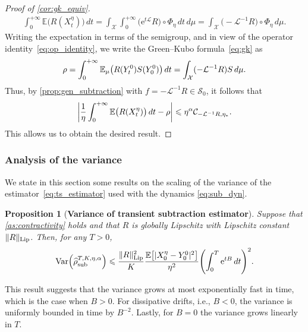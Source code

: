 \documentclass[11pt]{article}
\newcommand{\E}{\mathbb{E}}
\newcommand{\e}{\mathrm{e}}
\renewcommand{\L}{\mathcal{L}}
\renewcommand{\S}{\mathscr{S}}
\renewcommand{\leq}{\leqslant}
\DeclareMathOperator{\Var}{Var}
\DeclarePairedDelimiter\abs{\lvert}{\rvert}
\DeclarePairedDelimiter\paren{\lparen}{\rparen}
\DeclarePairedDelimiter\bkt{\lbrack}{\rbrack}
\newtheorem{proposition}{Proposition}
\theoremstyle{definition}
\newcommand{\RLip}{\|R\|_{\rm Lip}}
\newcommand{\estTmp}{\widehat{\rho}}
\newcommand{\aTSest}{\estTmp^{T,K,\eta,\alpha}_{\rm sub}} %
\begin{document}
\begin{proof}[Proof of \cref{cor:gk_equiv}]
\begin{align}
		\int_0^{+\infty} \E\bigl(R(X^\eta_t)\bigr) \, dt = \int_\mathcal{X}\int_0^{+\infty} \bigl(\e^{t\L}R\bigr)\circ \Phi_\eta \, dt \, d\mu
= \int_\mathcal{X} \bigl(-\L^{-1}R\bigr)\circ \Phi_\eta \, d\mu.
		\label{eq:cor_Tint_to_LinvR}
\end{align}
Writing the expectation in terms of the semigroup, and in view of the operator identity~\eqref{eq:op_identity}, we write the Green--Kubo formula~\eqref{eq:gk} as
\begin{align}
    \notag
		\rho = \int_0^{+\infty} \E_\mu\bigl(R(Y_t^0)S(Y_0^0)\bigr) \, dt = \int_\mathcal{X} (-\L^{-1}R)S \, d\mu.
	\end{align}
Thus, by \cref{prop:gen_subtraction} with $f = -\L^{-1}R \in \S_0$, it follows that
\begin{equation}
		\abs*{\frac{1}{\eta}\int_0^{+\infty} \E\bigl(R(X^\eta_t)\bigr) \, dt - \rho} \leq \eta^{\alpha} \mathcal{C}_{-\L^{-1}R,\eta_*}.
		\label{eq:cor_eta_bias}
	\end{equation}
This allows us to obtain the desired result.
\end{proof}

\subsubsection{Analysis of the variance}
\label{subsubsec:variance_analysis}
We state in this section some results on the scaling of the variance of the estimator~\eqref{eq:ts_estimator} used with the dynamics \eqref{eq:sub_dyn}.

\begin{proposition}[{\bf Variance of transient subtraction estimator}]
	\label{prop:var_ts}
	Suppose that \cref{as:contractivity} holds and that $R$ is globally Lipschitz with Lipschitz constant $\RLip$. Then, for any $T>0$,
\begin{equation}
		\Var\paren*{\aTSest} \leq \frac{\RLip^2}{K}\frac{\E\bkt*{|X_0^\eta - Y_0^0|^2}}{\eta^2}\paren*{\int_0^T \e^{tB} \, dt}^2.
\label{eq:var_prop_bound}
	\end{equation}
\end{proposition}
This result suggests that the variance grows at most exponentially fast in time, which is the case when $B>0$. For dissipative drifts, i.e., $B<0$, the variance is uniformly bounded in time by $B^{-2}$. Lastly, for $B=0$ the variance grows linearly in $T$.
\end{document}
